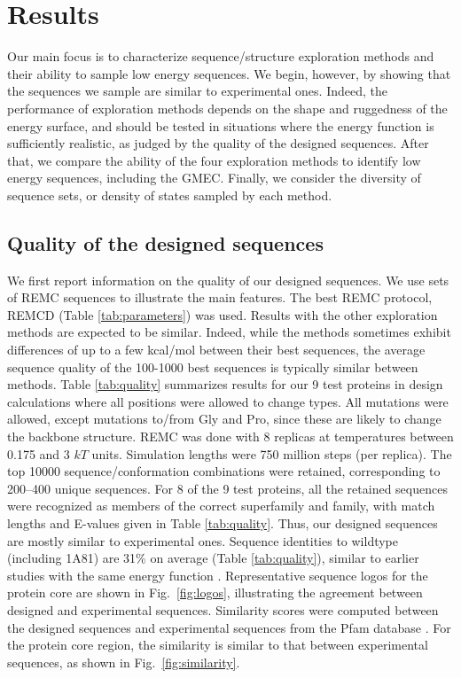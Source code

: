 \documentclass[a4paper,12pt]{article}
\begin{document}
\section{Results}
Our main focus is to characterize sequence/structure exploration methods and their ability to sample low energy
sequences. We begin, however, by showing that the sequences we sample are similar to experimental ones. Indeed,
the performance of exploration methods depends on the shape and ruggedness of the energy surface, and should be
tested in situations where the energy function is sufficiently realistic, as judged by the quality of the designed
sequences. After that, we compare the ability of the four exploration methods to identify low energy sequences,
including the GMEC. Finally, we consider the diversity of sequence sets, or density of states sampled by each method.

\subsection{Quality of the designed sequences}
We first report information on the quality of our designed sequences. We use sets of REMC sequences to illustrate
the main features. The best REMC protocol, REMCD (Table \ref{tab:parameters}) was used. Results with the other
exploration methods are expected to be similar. Indeed, while the methods sometimes exhibit differences of up to a
few kcal/mol between their best sequences, the average sequence quality of the 100-1000 best sequences is typically similar
between methods. Table \ref{tab:quality} summarizes results for our 9 test proteins in design calculations where all
positions were allowed to change types. All mutations were allowed, except mutations to/from Gly and Pro, since these
are likely to change the backbone structure. REMC was done with 8 replicas at temperatures between 0.175 and 3 $kT$
units. Simulation lengths were 750 million steps (per replica). The top 10000 sequence/conformation combinations were
retained, corresponding to 200--400 unique sequences. For 8 of the 9 test proteins, all the retained sequences were
recognized as members of the correct superfamily and family, with match lengths and E-values given in Table \ref{tab:quality}.
Thus, our designed sequences are mostly similar to experimental ones. Sequence identities to wildtype (including 1A81)
are 31\% on average (Table \ref{tab:quality}), similar to earlier studies with the same energy function \cite{Schmidt09,
Schmidt10}. Representative sequence logos for the protein core are shown in Fig.\ \ref{fig:logos}, illustrating the
agreement between designed and experimental sequences. Similarity scores were computed between the designed sequences
and experimental sequences from the Pfam database \cite{Pfam}. For the protein core region, the similarity is similar
to that between experimental sequences, as shown in Fig.\ \ref{fig:similarity}.
\end{document}
